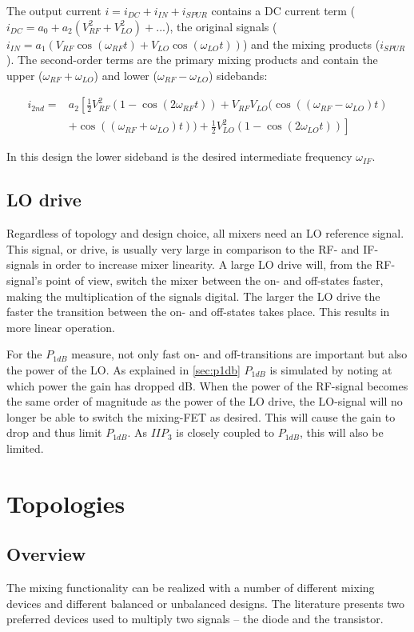 			The output current $i=i_{DC}+i_{IN}+i_{SPUR}$ contains a DC current term ($i_{DC} = a_0 + a_2(V_{RF}^2+V_{LO}^2)+...$), the original signals ($i_{IN}=a_1(V_{RF}\cos(\omega_{RF}t) + V_{LO}\cos(\omega_{LO}t))$) and the mixing products ($i_{SPUR}$). The second-order terms are the primary mixing products and contain the upper ($\omega_{RF}+\omega_{LO}$) and lower ($\omega_{RF}-\omega_{LO}$) sidebands:

			\begin{align}\label{eq:mixedsecondorder}
				i_{2nd} = &a_2 \left [ \frac{1}{2}V^2_{RF}(1-\cos(2\omega_{RF}t)) + V_{RF}V_{LO}(\cos((\omega_{RF}-\omega_{LO})t) \right. \nonumber \\
				&\left. + \cos((\omega_{RF}+\omega_{LO})t)) + \frac{1}{2}V^2_{LO}(1-\cos(2\omega_{LO}t)) \right]
			\end{align}

			In this design the lower sideband is the desired intermediate frequency $\omega_{IF}$.

		\subsection{LO drive}\label{sec:mixer_lodrive}
			Regardless of topology and design choice, all mixers need an LO reference signal. This signal, or drive, is usually very large in comparison to the RF- and IF-signals in order to increase mixer linearity. A large LO drive will, from the RF-signal's point of view, switch the mixer between the on- and off-states faster, making the multiplication of the signals digital. The larger the LO drive the faster the transition between the on- and off-states takes place. This results in more linear operation.\autocite{maas92}

			For the $P_{1dB}$ measure, not only fast on- and off-transitions are important but also the power of the LO. As explained in \autoref{sec:p1db} $P_{1dB}$ is simulated by noting at which power the gain has dropped \unit[1]{dB}. When the power of the RF-signal becomes the same order of magnitude as the power of the LO drive, the LO-signal will no longer be able to switch the mixing-FET as desired. This will cause the gain to drop and thus limit $P_{1dB}$. As $IIP_3$ is closely coupled to $P_{1dB}$, this will also be limited.\autocite{kundert02}

	\section{Topologies}
		\subsection{Overview}
			The mixing functionality can be realized with a number of different mixing devices and different balanced or unbalanced designs. The literature presents two preferred devices used to multiply two signals -- the diode and the transistor.\autocite{norman2002design}

